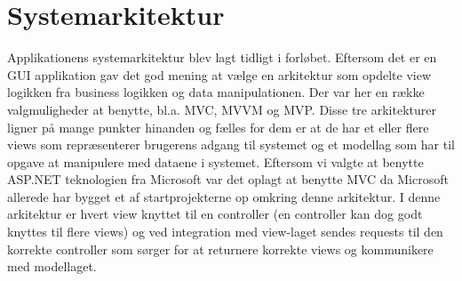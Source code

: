 \section{Systemarkitektur}

Applikationens systemarkitektur blev lagt tidligt i forløbet. Eftersom det er en GUI applikation gav det god mening at vælge en arkitektur som opdelte view logikken fra business logikken og data manipulationen. Der var her en række valgmuligheder at benytte, bl.a. MVC, MVVM og MVP. Disse tre arkitekturer ligner på mange punkter hinanden og fælles for dem er at de har et eller flere views som repræsenterer brugerens adgang til systemet og et modellag som har til opgave at manipulere med dataene i systemet. Eftersom vi valgte at benytte ASP.NET teknologien fra Microsoft \citep{aspnetmvcWeb} var det oplagt at benytte MVC da Microsoft allerede har  bygget et af startprojekterne op omkring denne arkitektur. I denne arkitektur er hvert view knyttet til en controller (en controller kan dog godt knyttes til flere views) og ved integration med view-laget sendes requests til den korrekte controller som sørger for at returnere korrekte views og kommunikere med modellaget. 